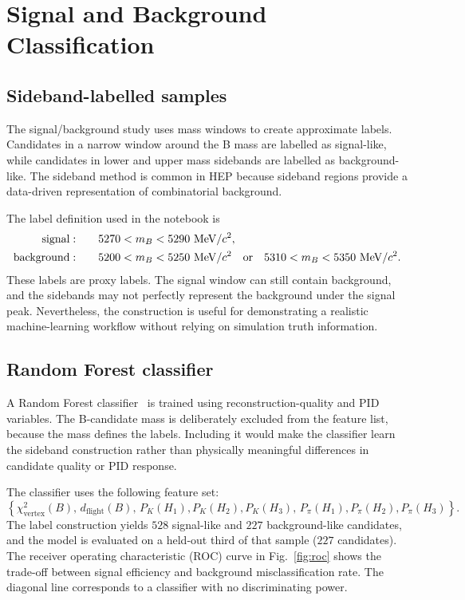 \section{Signal and Background Classification}

\subsection{Sideband-labelled samples}

The signal/background study uses mass windows to create approximate labels. Candidates in a narrow window around the B mass are labelled as signal-like, while candidates in lower and upper mass sidebands are labelled as background-like. The sideband method is common in HEP because sideband regions provide a data-driven representation of combinatorial background.

The label definition used in the notebook is
\begin{align}
  \mathrm{signal:} \qquad & 5270 < m_B < 5290~\mathrm{MeV}/c^2, \\
  \mathrm{background:} \qquad & 5200 < m_B < 5250~\mathrm{MeV}/c^2 \quad \mathrm{or} \quad
  5310 < m_B < 5350~\mathrm{MeV}/c^2 .
\end{align}
These labels are proxy labels. The signal window can still contain background, and the sidebands may not perfectly represent the background under the signal peak. Nevertheless, the construction is useful for demonstrating a realistic machine-learning workflow without relying on simulation truth information.

\subsection{Random Forest classifier}

A Random Forest classifier~\cite{sklearn} is trained using reconstruction-quality and PID variables. The B-candidate mass is deliberately excluded from the feature list, because the mass defines the labels. Including it would make the classifier learn the sideband construction rather than physically meaningful differences in candidate quality or PID response.

The classifier uses the following feature set:
\begin{equation}
  \left\{
  \chi^2_{\mathrm{vertex}}(B),\,
  d_{\mathrm{flight}}(B),\,
  P_K(H_1), P_K(H_2), P_K(H_3),\,
  P_{\pi}(H_1), P_{\pi}(H_2), P_{\pi}(H_3)
  \right\}.
\end{equation}
The label construction yields $528$ signal-like and $227$ background-like
candidates, and the model is evaluated on a held-out third of that sample
($227$ candidates). The receiver operating characteristic (ROC) curve in
Fig.~\ref{fig:roc} shows the trade-off between signal efficiency and background
misclassification rate. The diagonal line corresponds to a classifier with no
discriminating power.

